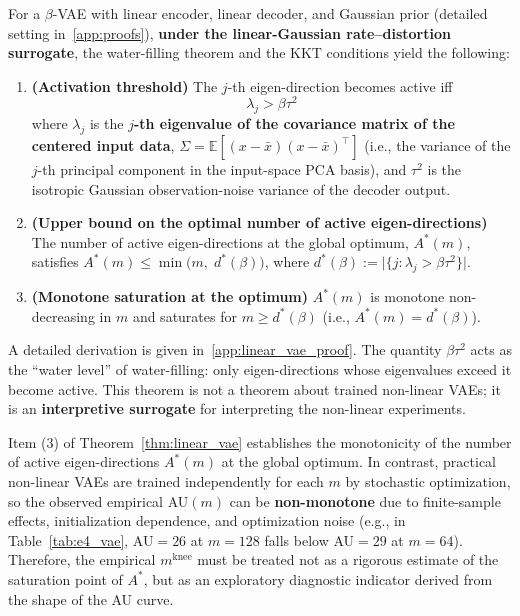 \documentclass[make,article,submit,pdftex,moreauthors]{Definitions/mdpi}
\newcommand{\mknee}{m^{\mathrm{knee}}}
\begin{document}
\begin{Theorem}\label{thm:linear_vae}
For a $\beta$-VAE with linear encoder, linear decoder, and Gaussian prior
(detailed setting in~\ref{app:proofs}),
\textbf{under the linear-Gaussian rate--distortion surrogate},
the water-filling theorem and the KKT conditions yield the following:

\begin{enumerate}
  \item \textbf{(Activation threshold)} The $j$-th eigen-direction becomes active iff
        \begin{equation}
          \lambda_j > \beta \tau^2 \label{eq:au_threshold}
        \end{equation}
        where $\lambda_j$ is the \textbf{$j$-th eigenvalue of the covariance matrix of
        the centered input data},
        $\Sigma = \mathbb{E}[(x-\bar{x})(x-\bar{x})^\top]$
        (i.e., the variance of the $j$-th principal component in the input-space PCA
        basis), and $\tau^2$ is the isotropic Gaussian observation-noise variance of
        the decoder output.
  \item \textbf{(Upper bound on the optimal number of active eigen-directions)}
        The number of active eigen-directions at the global optimum, $A^*(m)$,
        satisfies $A^*(m) \leq \min\bigl(m,\; d^*(\beta)\bigr)$, where
        $d^*(\beta) := \bigl|\{j : \lambda_j > \beta\tau^2\}\bigr|$.
  \item \textbf{(Monotone saturation at the optimum)}
        $A^*(m)$ is monotone non-decreasing in $m$ and saturates for
        $m \geq d^*(\beta)$ (i.e., $A^*(m) = d^*(\beta)$).
\end{enumerate}

\noindent
A detailed derivation is given in~\ref{app:linear_vae_proof}.
The quantity $\beta\tau^2$ acts as the ``water level'' of water-filling:
only eigen-directions whose eigenvalues exceed it become active.
This theorem is not a theorem about trained non-linear VAEs; it is an
\textbf{interpretive surrogate} for interpreting the non-linear experiments.
\end{Theorem}

\begin{Remark}
Item (3) of Theorem~\ref{thm:linear_vae} establishes the monotonicity of the number of
active eigen-directions $A^*(m)$ at the global optimum.
In contrast, practical non-linear VAEs are trained independently for each $m$ by
stochastic optimization, so the observed empirical AU$(m)$ can be
\textbf{non-monotone} due to finite-sample effects, initialization dependence, and
optimization noise
(e.g., in Table~\ref{tab:e4_vae}, AU$=26$ at $m=128$ falls below AU$=29$ at $m=64$).
Therefore, the empirical $\mknee$ must be treated not as a rigorous estimate of the
saturation point of $A^*$, but as an exploratory diagnostic indicator derived from the
shape of the AU curve.
\end{Remark}
\end{document}
